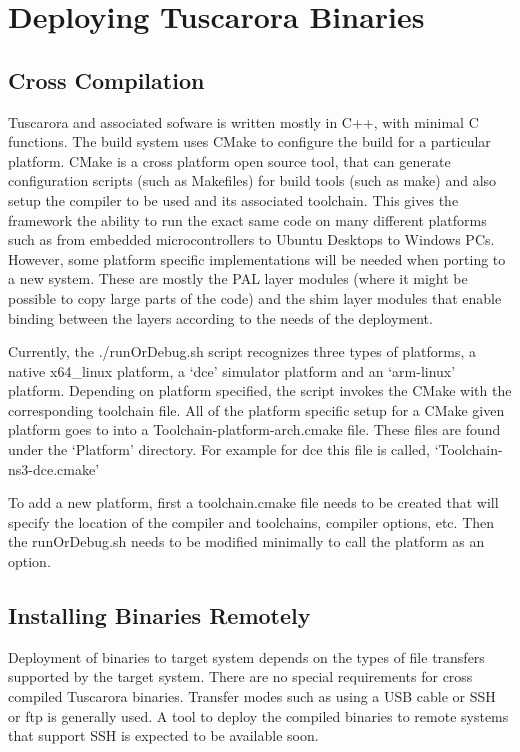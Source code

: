 \section{Deploying Tuscarora Binaries}
\subsection{Cross Compilation}
Tuscarora and associated sofware is written mostly in C++, with minimal C functions. The build system uses CMake \cite{cmake} to configure the build for a particular platform. CMake is a cross platform open source tool, that can generate configuration scripts (such as Makefiles) for build tools (such as make) and also setup the compiler to be used and its associated toolchain. This gives the framework the ability to run the exact same code on many different platforms such as from embedded microcontrollers to Ubuntu Desktops to Windows PCs. However, some platform specific implementations will be needed when porting to a new system. These are mostly the PAL layer modules (where it might be possible to copy large parts of the code) and the shim layer modules that enable binding between the layers according to the needs of the deployment.

Currently, the ./runOrDebug.sh script recognizes three types of platforms, a native x64\_linux platform, a `dce' simulator platform and an `arm-linux' platform. Depending on platform specified, the script invokes the CMake with the corresponding toolchain file. All of the platform specific setup for a CMake given platform goes to into a Toolchain-platform-arch.cmake file. These files are found under the `Platform' directory. For example for dce this file is called, `Toolchain-ns3-dce.cmake'

To add a new platform, first a toolchain.cmake file needs to be created that will specify the location of the compiler and toolchains, compiler options, etc. Then the runOrDebug.sh needs to be modified minimally to call the platform as an option.

\subsection{Installing Binaries Remotely}
Deployment of binaries to target system depends on the types of file transfers supported by the target system. There are no special requirements for cross compiled Tuscarora binaries. Transfer modes such as using a USB cable or SSH or ftp is generally used. A tool to deploy the compiled binaries to remote systems that support SSH is expected to be available soon.

